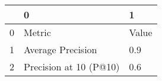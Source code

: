 \begin{tabular}{lll}
\toprule
{} &                       0 &      1 \\
\midrule
0 &                  Metric &  Value \\
1 &       Average Precision &    0.9 \\
2 &  Precision at 10 (P@10) &    0.6 \\
\bottomrule
\end{tabular}

